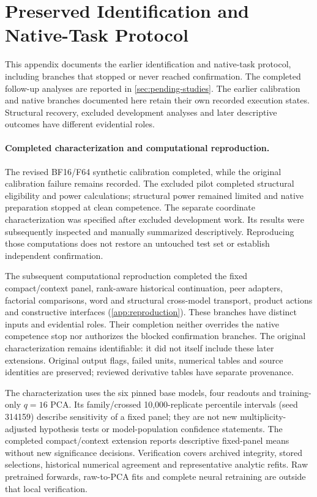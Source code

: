 \section{Preserved Identification and Native-Task Protocol}
\label{app:prospective}
This appendix documents the earlier identification and native-task protocol, including branches that stopped or never reached confirmation. The completed follow-up analyses are reported in \cref{sec:pending-studies}. The earlier calibration and native branches documented here retain their own recorded execution states. Structural recovery, excluded development analyses and later descriptive outcomes have different evidential roles.

\paragraph{Completed characterization and computational reproduction.}
The revised BF16/F64 synthetic calibration completed, while the original calibration failure remains recorded. The excluded pilot completed structural eligibility and power calculations; structural power remained limited and native preparation stopped at clean competence. The separate coordinate characterization was specified after excluded development work. Its results were subsequently inspected and manually summarized descriptively. Reproducing those computations does not restore an untouched test set or establish independent confirmation.

The subsequent computational reproduction completed the fixed compact/context panel, rank-aware historical continuation, peer adapters, factorial comparisons, word and structural cross-model transport, product actions and constructive interfaces (\cref{app:reproduction}). These branches have distinct inputs and evidential roles. Their completion neither overrides the native competence stop nor authorizes the blocked confirmation branches. The original characterization remains identifiable: it did not itself include these later extensions. Original output flags, failed units, numerical tables and source identities are preserved; reviewed derivative tables have separate provenance.

The characterization uses the six pinned base models, four readouts and training-only $q=16$ PCA. Its family/crossed 10,000-replicate percentile intervals (seed 314159) describe sensitivity of a fixed panel; they are not new multiplicity-adjusted hypothesis tests or model-population confidence statements. The completed compact/context extension reports descriptive fixed-panel means without new significance decisions. Verification covers archived integrity, stored selections, historical numerical agreement and representative analytic refits. Raw pretrained forwards, raw-to-PCA fits and complete neural retraining are outside that local verification.

